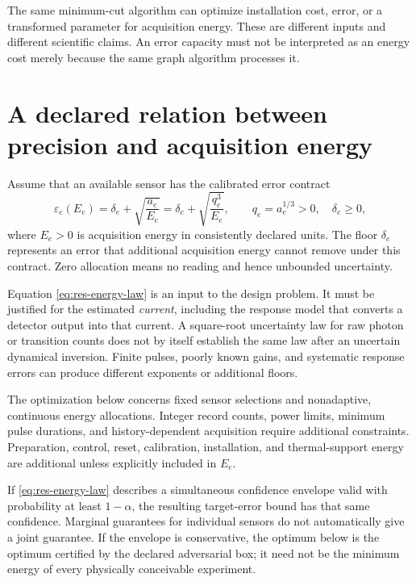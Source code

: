 The same minimum-cut algorithm can optimize installation cost, error, or a
transformed parameter for acquisition energy. These are different inputs and
different scientific claims. An error capacity must not be interpreted as an
energy cost merely because the same graph algorithm processes it.

\section{A declared relation between precision and acquisition energy}

Assume that an available sensor has the calibrated error contract
\begin{equation}
 \varepsilon_e(E_e)
 =\delta_e+\sqrt{\frac{a_e}{E_e}}
 =\delta_e+\sqrt{\frac{q_e^3}{E_e}},
 \qquad q_e=a_e^{1/3}>0,\quad \delta_e\geq0,
 \label{eq:res-energy-law}
\end{equation}
where $E_e>0$ is acquisition energy in consistently declared units. The floor
$\delta_e$ represents an error that additional acquisition energy cannot
remove under this contract. Zero allocation means no reading and hence
unbounded uncertainty.

Equation \eqref{eq:res-energy-law} is an input to the design problem. It must
be justified for the estimated \emph{current}, including the response model
that converts a detector output into that current. A square-root uncertainty
law for raw photon or transition counts does not by itself establish the same
law after an uncertain dynamical inversion. Finite pulses, poorly known gains,
and systematic response errors can produce different exponents or additional
floors.

The optimization below concerns fixed sensor selections and nonadaptive,
continuous energy allocations. Integer record counts, power limits, minimum
pulse durations, and history-dependent acquisition require additional
constraints. Preparation, control, reset, calibration, installation, and
thermal-support energy are additional unless explicitly included in $E_e$.

If \eqref{eq:res-energy-law} describes a simultaneous confidence envelope
valid with probability at least $1-\alpha$, the resulting target-error bound
has that same confidence. Marginal guarantees for individual sensors do not
automatically give a joint guarantee. If the envelope is conservative, the
optimum below is the optimum certified by the declared adversarial box; it
need not be the minimum energy of every physically conceivable experiment.

